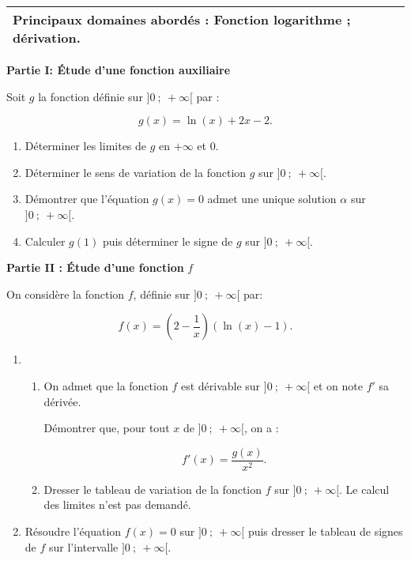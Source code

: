 
\medskip

\begin{tabularx}{\linewidth}{|X|}\hline
\textbf{Principaux domaines abordés :
Fonction logarithme ; dérivation.}\\ \hline
\end{tabularx}

\bigskip

\textbf{Partie I: Étude d'une fonction auxiliaire}

\medskip

Soit $g$ la fonction définie sur $]0~;~+\infty[$ par :

\[g(x) = \ln(x) + 2x - 2.\]

\smallskip

\begin{enumerate}
\item Déterminer les limites de $g$ en $+\infty$ et $0$.
\item Déterminer le sens de variation de la fonction $g$ sur $]0~;~ +\infty[$.
\item Démontrer que l'équation $g(x) = 0$ admet une unique solution $\alpha$ sur $]0~;~ +\infty[$. 
\item Calculer $g(1)$ puis déterminer le signe de $g$ sur $]0~;~ +\infty[$.
\end{enumerate}

\bigskip

\textbf{Partie II : Étude d'une fonction } \boldmath $f$\unboldmath

\medskip

On considère la fonction $f$, définie sur $]0~;~ +\infty[$ par: 

\[f(x) = \left(2 - \dfrac{1}{x}\right)\left(\ln (x) - 1\right).\]

\begin{enumerate}
\item 
	\begin{enumerate}
		\item On admet que la fonction $f$ est dérivable sur $]0~;~ +\infty[$ et on note $f'$ sa dérivée.

Démontrer que, pour tout $x$ de $]0~;~ +\infty[$, on a : 

\[f'(x) = \dfrac{g(x)}{x^2}.\]

		\item Dresser le tableau de variation de la fonction $f$ sur $]0~;~ +\infty[$. Le calcul des limites n'est pas demandé.
	\end{enumerate}
\item  Résoudre l'équation $f(x) = 0$ sur $]0~;~ +\infty[$ puis dresser le tableau de signes de $f$ sur l'intervalle $]0~;~ +\infty[$.
\end{enumerate}

